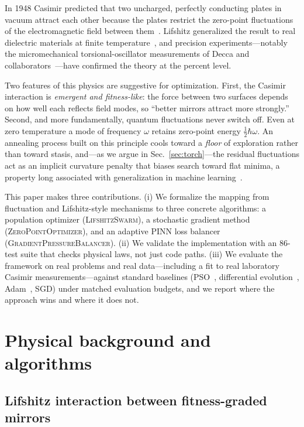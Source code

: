 \documentclass[10pt,twocolumn]{article}
\begin{document}
In 1948 Casimir predicted that two uncharged, perfectly conducting plates in vacuum attract
each other because the plates restrict the zero-point fluctuations of the electromagnetic field
between them~\cite{casimir1948}. Lifshitz generalized the result to real dielectric materials
at finite temperature~\cite{lifshitz1956}, and precision experiments---notably the
micromechanical torsional-oscillator measurements of Decca and
collaborators~\cite{decca2007}---have confirmed the theory at the percent level.

Two features of this physics are suggestive for optimization. First, the Casimir interaction is
\emph{emergent and fitness-like}: the force between two surfaces depends on how well each
reflects field modes, so ``better mirrors attract more strongly.'' Second, and more
fundamentally, quantum fluctuations never switch off. Even at zero temperature a mode of
frequency $\omega$ retains zero-point energy $\tfrac{1}{2}\hbar\omega$. An annealing process
built on this principle cools toward a \emph{floor} of exploration rather than toward stasis,
and---as we argue in Sec.~\ref{sec:torch}---the residual fluctuations act as an implicit
curvature penalty that biases search toward flat minima, a property long associated with
generalization in machine learning~\cite{hochreiter1997}.

This paper makes three contributions. (i) We formalize the mapping from fluctuation and
Lifshitz-style mechanisms to three concrete algorithms: a population optimizer
(\textsc{LifshitzSwarm}), a stochastic gradient method (\textsc{ZeroPointOptimizer}), and an
adaptive PINN loss balancer (\textsc{GradientPressureBalancer}). (ii) We validate the implementation with an 86-test suite
that checks physical laws, not just code paths. (iii) We evaluate the framework on real
problems and real data---including a fit to real laboratory Casimir measurements---against
standard baselines (PSO~\cite{kennedy1995}, differential evolution~\cite{storn1997},
Adam~\cite{kingma2015}, SGD) under matched evaluation budgets, and we report where the approach
wins and where it does not.

\section{Physical background and algorithms}

\subsection{Lifshitz interaction between fitness-graded mirrors}
\label{sec:lifshitz}
\end{document}
